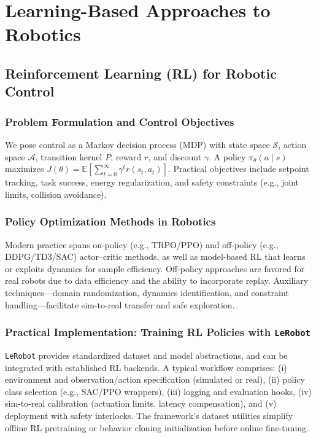 \section{Learning-Based Approaches to Robotics}
\label{sec:learning}

\subsection{Reinforcement Learning (RL) for Robotic Control}
\subsubsection{Problem Formulation and Control Objectives}
We pose control as a Markov decision process (MDP) with state space \(\mathcal{S}\), action space \(\mathcal{A}\), transition kernel \(P\), reward \(r\), and discount \(\gamma\). A policy \(\pi_\theta(a\!\mid\!s)\) maximizes \(J(\theta)=\mathbb{E}\!\left[\sum_{t=0}^{\infty}\gamma^t r(s_t,a_t)\right]\). Practical objectives include setpoint tracking, task success, energy regularization, and safety constraints (e.g., joint limits, collision avoidance).

\subsubsection{Policy Optimization Methods in Robotics}
Modern practice spans on-policy (e.g., TRPO/PPO) and off-policy (e.g., DDPG/TD3/SAC) actor–critic methods, as well as model-based RL that learns or exploits dynamics for sample efficiency. Off-policy approaches are favored for real robots due to data efficiency and the ability to incorporate replay. Auxiliary techniques—domain randomization, dynamics identification, and constraint handling—facilitate sim-to-real transfer and safe exploration.

\subsubsection{Practical Implementation: Training RL Policies with \texttt{LeRobot}}
\texttt{LeRobot} provides standardized dataset and model abstractions, and can be integrated with established RL backends. A typical workflow comprises: (i) environment and observation/action specification (simulated or real), (ii) policy class selection (e.g., SAC/PPO wrappers), (iii) logging and evaluation hooks, (iv) sim-to-real calibration (actuation limits, latency compensation), and (v) deployment with safety interlocks. The framework’s dataset utilities simplify offline RL pretraining or behavior cloning initialization before online fine-tuning.

